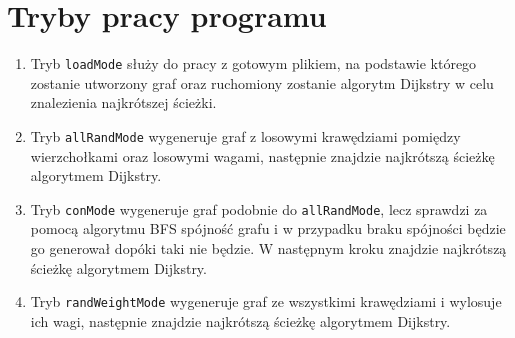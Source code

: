 \documentclass{article}
\begin{document}
\section{Tryby pracy programu}
\begin{enumerate}
    \item Tryb \texttt{loadMode} służy do pracy z gotowym plikiem, na podstawie którego zostanie utworzony graf oraz ruchomiony zostanie algorytm Dijkstry w celu znalezienia najkrótszej ścieżki.
    \item Tryb \texttt{allRandMode} wygeneruje graf z losowymi krawędziami pomiędzy wierzchołkami oraz losowymi wagami, następnie znajdzie najkrótszą ścieżkę algorytmem Dijkstry.
    \item Tryb \texttt{conMode} wygeneruje graf podobnie do \texttt{allRandMode}, lecz sprawdzi za pomocą algorytmu BFS spójność grafu i w przypadku braku spójności będzie go generował dopóki taki nie będzie. W następnym kroku znajdzie najkrótszą ścieżkę algorytmem Dijkstry.
    \item Tryb \texttt{randWeightMode} wygeneruje graf ze wszystkimi krawędziami i wylosuje ich wagi, następnie znajdzie najkrótszą ścieżkę algorytmem Dijkstry. 
    
\end {enumerate}
\end{document}
